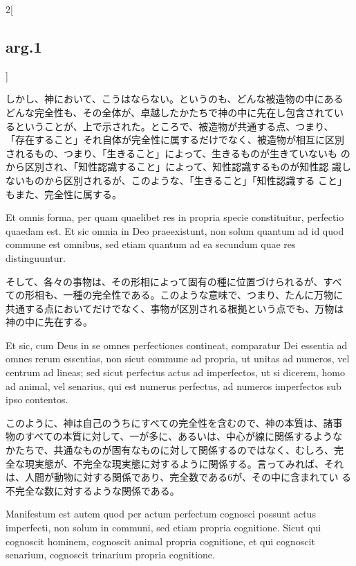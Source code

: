 \documentclass[paper=a4paper,fontsize=10pt,jafontsize=9pt,titlepage]{jlreq}
\begin{document}
\begin{paracol}{2}[\subsection{arg.1}]
\switchcolumn

しかし、神において、こうはならない。というのも、どんな被造物の中にある
どんな完全性も、その全体が、卓越したかたちで神の中に先在し包含されてい
るということが、上で示された。ところで、被造物が共通する点、つまり、
「存在すること」それ自体が完全性に属するだけでなく、被造物が相互に区別
されるもの、つまり、「生きること」によって、生きるものが生きていないも
のから区別され、「知性認識すること」によって、知性認識するものが知性認
識しないものから区別されるが、このような、「生きること」「知性認識する
こと」もまた、完全性に属する。

\switchcolumn*

Et omnis forma, per quam quaelibet res in propria specie constituitur,
perfectio quaedam est. Et sic omnia in Deo praeexistunt, non solum
quantum ad id quod commune est omnibus, sed etiam quantum ad ea
secundum quae res distinguuntur.

\switchcolumn

そして、各々の事物は、その形相によって固有の種に位置づけられるが、すべ
ての形相も、一種の完全性である。このような意味で、つまり、たんに万物に
共通する点においてだけでなく、事物が区別される根拠という点でも、万物は
神の中に先在する。

\switchcolumn*

Et sic, cum Deus in se omnes perfectiones contineat, comparatur Dei
essentia ad omnes rerum essentias, non sicut commune ad propria, ut
unitas ad numeros, vel centrum ad lineas; sed sicut perfectus actus ad
imperfectos, ut si dicerem, homo ad animal, vel senarius, qui est
numerus perfectus, ad numeros imperfectos sub ipso contentos.

\switchcolumn

このように、神は自己のうちにすべての完全性を含むので、神の本質は、諸事
物のすべての本質に対して、一が多に、あるいは、中心が線に関係するような
かたちで、共通なものが固有なものに対して関係するのではなく、むしろ、完
全な現実態が、不完全な現実態に対するように関係する。言ってみれば、それ
は、人間が動物に対する関係であり、完全数である6が、その中に含まれてい
る不完全な数に対するような関係である。

\switchcolumn*

Manifestum est autem quod per actum perfectum cognosci possunt actus
imperfecti, non solum in communi, sed etiam propria cognitione. Sicut
qui cognoscit hominem, cognoscit animal propria cognitione, et qui
cognoscit senarium, cognoscit trinarium propria cognitione.

\switchcolumn


\end{paracol}
\end{document}
